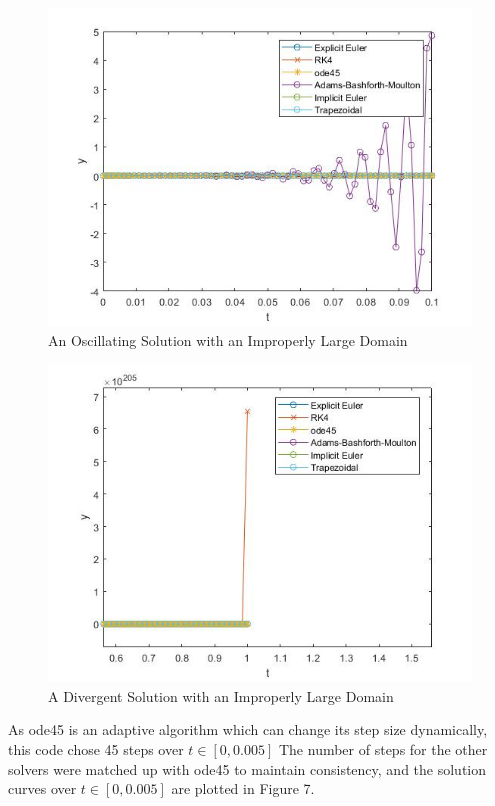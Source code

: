 \documentclass[11pt]{article}
\begin{document}
\begin{figure} [h]
\centering
        \includegraphics[totalheight=10cm]{figure3.jpg}
    \caption{An Oscillating Solution with an Improperly Large Domain}
    \label{figure5}
\end{figure}

\begin{figure} [h]
\centering
        \includegraphics[totalheight=10cm]{divergence.jpg}
    \caption{A Divergent Solution with an Improperly Large Domain}
    \label{figure6}
\end{figure}

As ode45 is an adaptive algorithm which can change its step size dynamically,
this code chose 45 steps over $t\in [0,0.005]$ The number of steps for the other 
solvers were matched up with ode45 to maintain consistency, and the solution curves 
over $t\in [0,0.005]$ are plotted in Figure 7.
\end{document}
